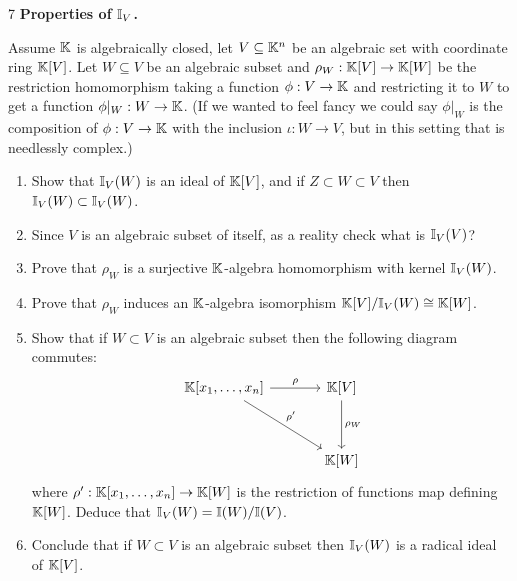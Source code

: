 \documentclass[Notebook.tex]{subfiles}
\begin{document}

\newpage 

\begin{problem}{7}
    \textbf{Properties of $\mathbb I_V$.}
    
    Assume $\mathbb K$ is algebraically closed, let $V\subseteq \mathbb K^n$ be an algebraic set with coordinate ring $\mathbb K[V]$. Let $W\subseteq V$ be an algebraic subset and $\rho_{W}: \mathbb K[V] \to \mathbb K[W]$ be the restriction homomorphism taking a function $\phi:V \to \mathbb K$ and restricting it to $W$ to get a function $\phi|_{W}:W\to \mathbb K$. (If we wanted to feel fancy we could say $\phi|_{W}$ is the composition of $\phi:V\to \mathbb K$ with the inclusion $\iota:W\to V$, but in this setting that is needlessly complex.) 
    \begin{enumerate}
        \item Show that $\mathbb I_V(W)$ is an ideal of $\mathbb K[V]$, and if $Z \subset W \subset V$ then $\mathbb I_{V}(W) \subset \mathbb I_{V}(W)$.
        \item Since $V$ is  an algebraic subset of itself, as a reality check what is $\mathbb I_{V}(V)$?
        \item Prove that $\rho_{W}$ is a surjective $\mathbb K$-algebra homomorphism with kernel $\mathbb I_V(W)$. 
        \item Prove that $\rho_W$ induces an $\mathbb K$-algebra isomorphism $\mathbb K[V]/\mathbb I_{V}(W) \cong \mathbb K[W]$. 
        \item Show that if $W \subset V$ is an algebraic subset then the following diagram commutes:
        \[
            \begin{tikzcd}[row sep = 3.5em, column sep = 3.5em]
            \K[x_1,\ldots,x_n] \arrow[r, "\rho"]  \arrow[dr,"\rho'"]& \K[V] \arrow[d, "\rho_W"]\\
            & \K[W]
            \end{tikzcd}
        \]
        where $\rho':\mathbb K[x_1,\ldots,x_n] \to \mathbb K[W]$ is the restriction of functions map defining $\mathbb K[W]$. Deduce that $\mathbb I_{V}(W) = \mathbb I(W)/\mathbb I(V)$. 
        \item Conclude that if $W \subset V$ is an algebraic subset then $\mathbb I_V(W)$ is a radical ideal of $\mathbb K[V]$.
    \end{enumerate}
\end{problem}
\end{document}
